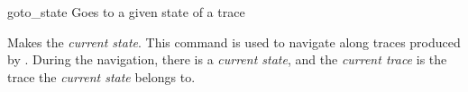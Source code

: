 \begin{nusmvCommand} {goto\_state} {Goes to a given state of a trace}


Makes  the \emph{current state}. This command is used to
navigate along traces produced by \nusmv. During the navigation, there
is a \emph{current state}, and the \emph{current trace} is the trace
the \emph{current state} belongs to.

\end{nusmvCommand}
